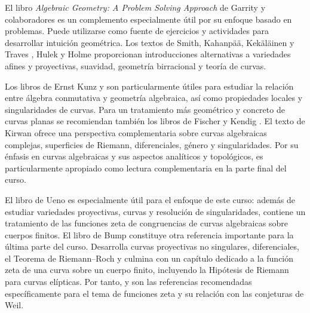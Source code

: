 \begin{refsection}
El libro \emph{Algebraic Geometry: A Problem Solving Approach} de Garrity y colaboradores \cite{Gar13} es un complemento especialmente útil por su enfoque basado en problemas. Puede utilizarse como fuente de ejercicios y actividades para desarrollar intuición geométrica. Los textos de Smith, Kahanpää, Kekäläinen y Traves \cite{SKKT00}, Hulek \cite{Hul03} y Holme \cite{Hol12} proporcionan introducciones alternativas a variedades afines y proyectivas, suavidad, geometría birracional y teoría de curvas.

Los libros de Ernst Kunz \cite{Kun13} y \cite{Kun05} son particularmente útiles para estudiar la relación entre álgebra conmutativa y geometría algebraica, así como propiedades locales y singularidades de curvas. Para un tratamiento más geométrico y concreto de curvas planas se recomiendan también los libros de Fischer \cite{Fis01} y Kendig \cite{Ken11}. El texto de Kirwan \cite{Kir92} ofrece una perspectiva complementaria sobre curvas algebraicas complejas, superficies de Riemann, diferenciales, género y singularidades. Por su énfasis en curvas algebraicas y sus aspectos analíticos y topológicos, es particularmente apropiado como lectura complementaria en la parte final del curso.

El libro de Ueno \cite{Uen97} es especialmente útil para el enfoque de este curso: además de estudiar variedades proyectivas, curvas y resolución de singularidades, contiene un tratamiento de las funciones zeta de congruencias de curvas algebraicas sobre cuerpos finitos. El libro de Bump \cite{Bum98} constituye otra referencia importante para la última parte del curso. Desarrolla curvas proyectivas no singulares, diferenciales, el Teorema de Riemann--Roch y culmina con un capítulo dedicado a la función zeta de una curva sobre un cuerpo finito, incluyendo la Hipótesis de Riemann para curvas elípticas. Por tanto, \cite{Uen97} y \cite{Bum98} son las referencias recomendadas específicamente para el tema de funciones zeta y su relación con las conjeturas de Weil.

\nocite{Ful89}
\nocite{Gar13}
\nocite{Uen97}
\nocite{SKKT00}
\nocite{Kun13}
\nocite{Hol12}
\nocite{Bum98}
\nocite{Hul03}
\nocite{Kun05}
\nocite{Fis01}
\nocite{Ken11}
\nocite{Kir92}

\printcursosbibliography
\end{refsection}
